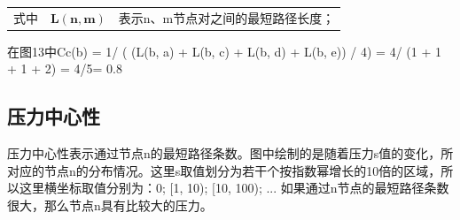 \begin{tabularx}{\textwidth}{@{}l@{\quad}r@{———}X@{}}
式中 & $\boldsymbol{L(n, m)}$ &  表示n、m节点对之间的最短路径长度；\\
\end{tabularx}\vspace{3.15bp}
在图13中Cc(b) = 1/ ( (L(b, a) + L(b, c) + L(b, d) + L(b, e)) / 4) = 4/ (1 + 1 + 1 + 2) = 4/5= 0.8

\subsection{压力中心性}
压力中心性表示通过节点n的最短路径条数。图中绘制的是随着压力s值的变化，所对应的节点n的分布情况。这里s取值划分为若干个按指数幂增长的10倍的区域，所以这里横坐标取值分别为：{0}; [1, 10); [10, 100); ... 如果通过n节点的最短路径条数很大，那么节点n具有比较大的压力。




